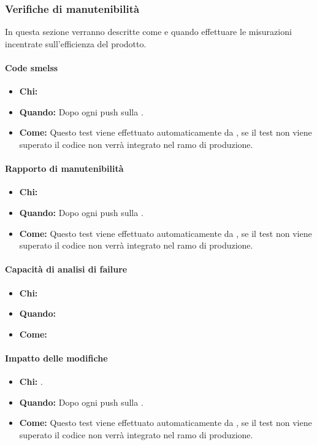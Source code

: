 \newpage
\subsubsection{Verifiche di manutenibilità}
In questa sezione verranno descritte come e quando effettuare le misurazioni incentrate sull'efficienza del prodotto.

\paragraph{Code smelss}
\begin{itemize}
\item \textbf{Chi:} 
\item \textbf{Quando:} Dopo ogni push sulla .
\item \textbf{Come:} Questo test viene effettuato automaticamente da , se il test non viene superato il codice non verrà integrato nel ramo di produzione.
\end{itemize}

\paragraph{Rapporto di manutenibilità}
\begin{itemize}
\item \textbf{Chi:} 
\item \textbf{Quando:} Dopo ogni push sulla .
\item \textbf{Come:} Questo test viene effettuato automaticamente da , se il test non viene superato il codice non verrà integrato nel ramo di produzione.
\end{itemize}

\paragraph{Capacità di analisi di failure}
\begin{itemize}
\item \textbf{Chi:}
\item \textbf{Quando:}
\item \textbf{Come:}
\end{itemize}

\paragraph{Impatto delle modifiche}
\begin{itemize}
\item \textbf{Chi:} .
\item \textbf{Quando:} Dopo ogni push sulla .
\item \textbf{Come:} Questo test viene effettuato automaticamente da , se il test non viene superato il codice non verrà integrato nel ramo di produzione.
\end{itemize}
